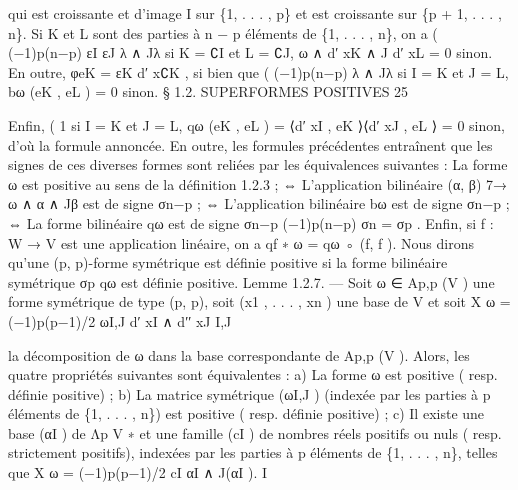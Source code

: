 \documentclass[
  10pt,
]{article}
\newenvironment{Shaded}{}{}
\newcommand{\NormalTok}[1]{#1}
\begin{document}
\begin{Shaded}
\begin{Highlighting}[]
\NormalTok{qui est croissante et d’image I sur \{1, . . . , p\} et est croissante sur \{p + 1, . . . , n\}. Si K}
\NormalTok{et L sont des parties à n − p éléments de \{1, . . . , n\}, on a}
\NormalTok{                                      (}
\NormalTok{                                        (−1)p(n−p) εI εJ λ ∧ Jλ si K = ∁I et L = ∁J,}
\NormalTok{           ω ∧ d′ xK ∧ J d′ xL =}
\NormalTok{                                        0                            sinon.}
\NormalTok{En outre, φeK = εK d′ x∁K , si bien que}
\NormalTok{                                (}
\NormalTok{                                 (−1)p(n−p) λ ∧ Jλ si I = K et J = L,}
\NormalTok{                bω (eK , eL ) =}
\NormalTok{                                 0                 sinon.}
\NormalTok{                                § 1.2. SUPERFORMES POSITIVES                                  25}

\NormalTok{Enfin,                                                      (}
\NormalTok{                                                             1 si I = K et J = L,}
\NormalTok{               qω (eK , eL ) = ⟨d′ xI , eK ⟩⟨d′ xJ , eL ⟩ =}
\NormalTok{                                                             0 sinon,}
\NormalTok{d’où la formule annoncée.}
\NormalTok{   En outre, les formules précédentes entraînent que les signes de ces diverses formes sont}
\NormalTok{reliées par les équivalences suivantes :}
\NormalTok{La forme ω est positive au sens de la définition 1.2.3 ;}
\NormalTok{⇔ L’application bilinéaire (α, β) 7→ ω ∧ α ∧ Jβ est de signe σn−p ;}
\NormalTok{⇔ L’application bilinéaire bω est de signe σn−p ;}
\NormalTok{⇔ La forme bilinéaire qω est de signe σn−p (−1)p(n−p) σn = σp .}
\NormalTok{   Enfin, si f : W → V est une application linéaire, on a qf ∗ ω = qω ◦ (f, f ).}
\NormalTok{   Nous dirons qu’une (p, p){-}forme symétrique est définie positive si la forme bilinéaire}
\NormalTok{symétrique σp qω est définie positive.}
\NormalTok{Lemme 1.2.7. — Soit ω ∈ Ap,p (V ) une forme symétrique de type (p, p), soit}
\NormalTok{(x1 , . . . , xn ) une base de V et soit}
\NormalTok{                                                X}
\NormalTok{                               ω = (−1)p(p−1)/2   ωI,J d′ xI ∧ d′′ xJ}
\NormalTok{                                               I,J}

\NormalTok{la décomposition de ω dans la base correspondante de Ap,p (V ). Alors, les quatre propriétés}
\NormalTok{suivantes sont équivalentes :}
\NormalTok{   a) La forme ω est positive ( resp. définie positive) ;}
\NormalTok{   b) La matrice symétrique (ωI,J ) (indexée par les parties à p éléments de \{1, . . . , n\})}
\NormalTok{est positive ( resp. définie positive) ;}
\NormalTok{   c) Il existe une base (αI ) de Λp V ∗ et une famille (cI ) de nombres réels positifs ou nuls}
\NormalTok{( resp. strictement positifs), indexées par les parties à p éléments de \{1, . . . , n\}, telles}
\NormalTok{que                                             X}
\NormalTok{                              ω = (−1)p(p−1)/2     cI αI ∧ J(αI ).}
\NormalTok{                                                     I}


\end{Highlighting}
\end{Shaded}
\end{document}
